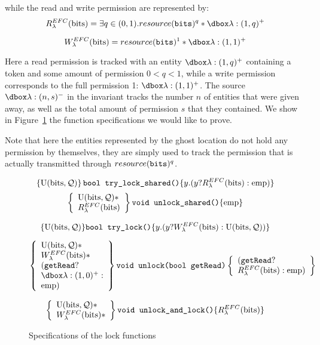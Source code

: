 while the read and write permission are represented by:
$$\rPerm = \exists q \in (0, 1).\ress{q}* \ghost{\lambda : (1, q)^+}$$

$$\wPerm = \ress{1} * \ghost{\lambda:(1, 1)^+}$$

Here a read permission is tracked with an entity $\ghost{\lambda :(1, q)^+}$ containing a token and some amount of permission $0 < q < 1$, while a write permission corresponds to the full permission 1: $\ghost{\lambda:(1, 1)^+}$. The source $\ghost{\lambda :(n, s)^{-}}$ in the invariant tracks the number $n$ of entities that were given away, as well as the total amount of permission $s$ that they contained. %
We show in Figure~\ref{fig:specRWFolly} the function specifications we would like to prove. 

Note that here the entities represented by the ghost location do not hold any permission by themselves, they are simply used to track the permission that is actually transmitted through $resource(\texttt{bits})^{q}$.

\begin{figure}
		$$\left \{\text{U}(\text {bits}, \mathcal{Q}) \right \} \texttt{bool try\_lock\_shared()}\{y. (y ? R_{\lambda}^{EFC}(\text{bits}) : \mathrm{emp})\}$$
\[
\left\{\begin{array}{l}\text{U}(\text {bits}, \mathcal{Q})* \\ {R_{\lambda}^{EFC}(\text{bits})}\end{array}\right\}
\texttt{void unlock\_shared()} \{\mathrm{emp}\} \]


$$\{\text{U}(\text {bits}, \mathcal{Q})\}\texttt{bool try\_lock()} \{y. (y ? W_{\lambda}^{EFC}(\text{bits}) : \text{U}(\text {bits}, \mathcal{Q}))\}$$


\[
\left\{\begin{array}{l}\Uperm* \\ \wPerm* \\ (\texttt{getRead} ? \\ \ghost{\lambda: (1, 0)^+} : \\ \emp) \end{array}\right\}
\texttt{void unlock(bool getRead)}
\left\{\begin{array}{l}(\texttt{getRead} ? \\ \rPerm : \emp) \end{array}\right\} \]

\[
\left\{\begin{array}{l}\text{U}(\text {bits}, \mathcal{Q})* \\ W_{\lambda}^{EFC}(\text{bits})* \end{array}\right\}
\texttt{void unlock\_and\_lock()}
\{R_{\lambda}^{EFC}(\text{bits})\} \]
\caption{Specifications of the lock functions}
\label{fig:specRWFolly}
\end{figure}

